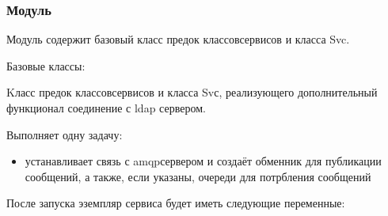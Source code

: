 \documentclass[a4paper,10pt,russian]{sphinxmanual}
\begin{document}
\subsubsection{Модуль }
\label{\detokenize{developer:base-svc}}
\sphinxAtStartPar
Модуль содержит базовый класс  \sphinxhyphen{} предок классов\sphinxhyphen{}сервисов и класса Svc.


\begin{fulllineitems}

\pysigstartsignatures
{}
\pysigstopsignatures
\sphinxAtStartPar
Базовые классы: 

\sphinxAtStartPar
Kласс  \sphinxhyphen{} предок классов\sphinxhyphen{}сервисов и класса Svс,
реализующего дополнительный функционал \textendash{} соединение с ldap сервером.

\sphinxAtStartPar
Выполняет одну задачу:
\begin{itemize}
\item {}
\sphinxAtStartPar
устанавливает связь с amqp\sphinxhyphen{}сервером и создаёт обменник для публикации
сообщений, а также, если указаны, очереди для потрбления сообщений

\end{itemize}

\sphinxAtStartPar
После запуска эземпляр сервиса будет иметь следующие переменные:

\begin{sphinxVerbatim}[commandchars=\\\{\}]
  
     


\end{sphinxVerbatim}
\end{fulllineitems}
\end{document}
